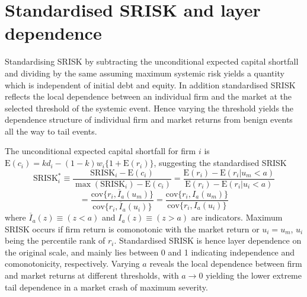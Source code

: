\documentclass[authoryear]{elsarticle}
\newcommand{\E}{\mathrm{E}}
\newcommand{\e}{\mathrm{e}}
\newcommand{\cov}{\mathrm{cov}}
\newcommand{\Ex}{{\cal E}}
\begin{document}

\section{Standardised SRISK and layer dependence}

Standardising SRISK by subtracting the unconditional expected capital shortfall and dividing by the same assuming maximum systemic risk yields a quantity which is independent of initial debt and equity. In addition standardised SRISK reflects the local dependence between an individual firm and the market at the selected threshold of the systemic event. Hence varying the threshold yields the dependence structure of individual firm and market returns from benign events all the way to tail events.

The unconditional expected capital shortfall for firm $i$ is $\E(c_i)=kd_i-(1-k)w_i\{1+\E(r_i)\}$, suggesting the standardised SRISK
$$
\mathrm{SRISK}_i^* \equiv \frac{\mathrm{SRISK}_i-\E(c_i)}{\max(\mathrm{SRISK}_i)-\E(c_i)}
=\frac{\E(r_i)-\E(r_i|u_m<a)}{\E(r_i)-\E(r_i|u_i<a)}
$$
$$
=\frac{\cov\{r_i,\overline{I}_a(u_m)\}}{\cov\{r_i,\overline{I}_a(u_i)\}}
=\frac{\cov\{r_i,I_a(u_m)\}}{\cov\{r_i,I_a(u_i)\}} 
$$
where $\overline{I}_a(z)\equiv (z<a)$ and $I_a(z)\equiv (z>a)$ are indicators. Maximum SRISK occurs if firm return is comonotonic with the market return or $u_i=u_m$, $u_i$ being the percentile rank of $r_i$. Standardised SRISK is hence layer dependence on the original scale, and mainly lies between 0 and 1 indicating independence and comonotonicity, respectively. Varying $a$ reveals the local dependence between firm and market returns at different thresholds, with $a\rightarrow 0$ yielding the lower extreme tail dependence in a market crash of maximum severity.
\end{document}
